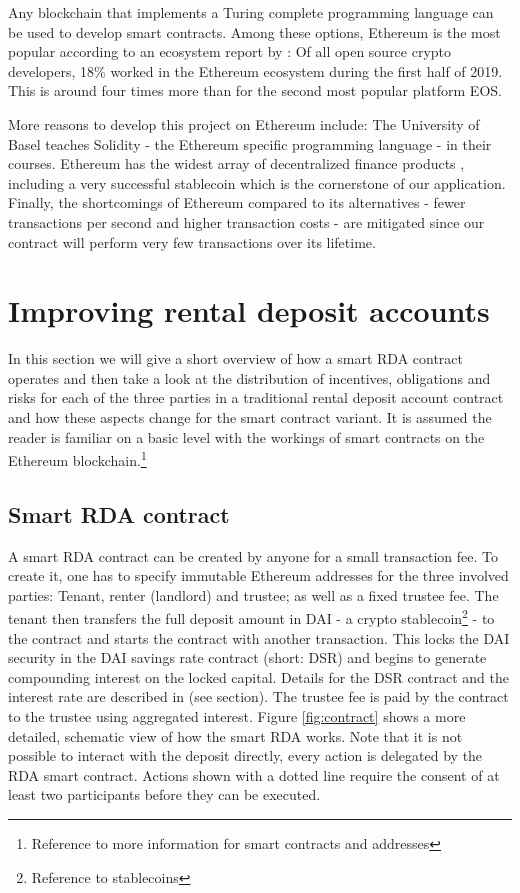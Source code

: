 \documentclass[12pt,a4paper,titlepage,oneside,english]{article}
\begin{document}
Any blockchain that implements a Turing complete programming language can be used to develop smart contracts. Among these options, Ethereum is the most popular according to an ecosystem report by \cite{ElectricCapital2019}: Of all open source crypto developers, 18\% worked in the Ethereum ecosystem during the first half of 2019. This is around four times more than for the second most popular platform EOS.

More reasons to develop this project on Ethereum include: The University of Basel teaches Solidity - the Ethereum specific programming language - in their courses. Ethereum has the widest array of decentralized finance products%
, including a very successful stablecoin which is the cornerstone of our application. Finally, the shortcomings of Ethereum compared to its alternatives - fewer transactions per second and higher transaction costs - are mitigated since our contract will perform very few transactions over its lifetime.




\section{Improving rental deposit accounts}
In this section we will give a short overview of how a smart RDA contract operates and then take a look at the distribution of incentives, obligations and risks for each of the three parties in a traditional rental deposit account contract and how these aspects change for the smart contract variant.
It is assumed the reader is familiar on a basic level with the workings of smart contracts on the Ethereum blockchain.\footnote{Reference to more information for smart contracts and addresses}

\subsection{Smart RDA contract}
A smart RDA contract can be created by anyone for a small transaction fee. To create it, one has to specify immutable Ethereum addresses for the three involved parties: Tenant, renter (landlord) and trustee; as well as a fixed trustee fee. The tenant then transfers the full deposit amount in DAI - a crypto stablecoin\footnote{Reference to stablecoins} - to the contract and starts the contract with another transaction. This locks the DAI security in the DAI savings rate contract (short: DSR) and begins to generate compounding interest on the locked capital. Details for the DSR contract and the interest rate are described in (see section). The trustee fee is paid by the contract to the trustee using aggregated interest.
Figure \ref{fig:contract} shows a more detailed, schematic view of how the smart RDA works. Note that it is not possible to interact with the deposit directly, every action is delegated by the RDA smart contract. Actions shown with a dotted line require the consent of at least two participants before they can be executed.
\end{document}
